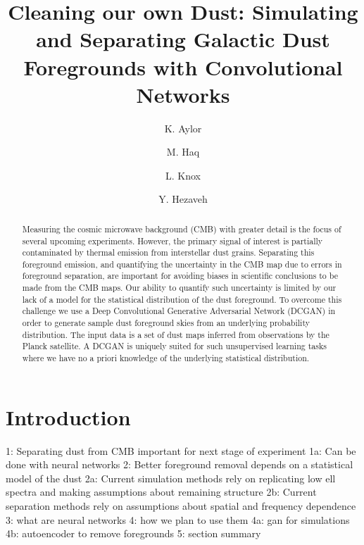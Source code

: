 \documentclass[twocolumn]{aastex62}
\begin{document}
\title{Cleaning our own Dust: Simulating and Separating Galactic Dust Foregrounds with Convolutional Networks}
\author{K. Aylor}
\author{ M. Haq}
\author{L. Knox }
\author{Y. Hezaveh }



\begin{abstract}
Measuring the cosmic microwave background (CMB) with greater detail is the focus of several upcoming experiments. However, the primary signal of interest is partially contaminated by thermal emission from interstellar dust grains. Separating this foreground emission, and
quantifying the uncertainty in the CMB map due to errors in foreground separation, are
important for avoiding biases in scientific conclusions to be made from the CMB maps. Our ability to quantify such uncertainty is limited by our lack of a model for the statistical
distribution of the dust foreground. To overcome this challenge we use a Deep Convolutional Generative Adversarial Network (DCGAN) in order to generate sample dust foreground skies from an underlying probability distribution. The input data is a set of dust maps inferred from observations by the Planck satellite. A DCGAN is uniquely suited for such unsupervised learning tasks where we have no a priori knowledge of the underlying statistical distribution.
\end{abstract}




\section{Introduction}
1: Separating dust from CMB important for next stage of experiment
1a: Can be done with neural networks
2: Better foreground removal depends on a statistical model of the dust
2a: Current simulation methods rely on replicating low ell spectra and making assumptions about remaining structure
2b: Current separation methods rely on assumptions about spatial and frequency dependence
3: what are neural networks
4: how we plan to use them
4a: gan for simulations
4b: autoencoder to remove foregrounds
5: section summary
\end{document}
